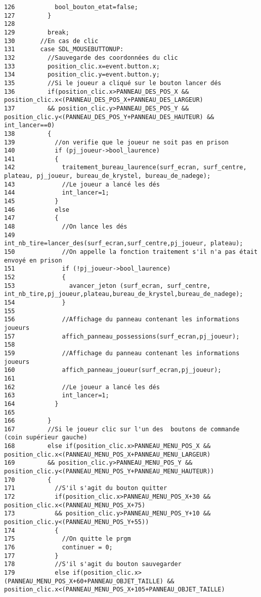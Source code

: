 \begin{Code}
\begin{verbatim}
126           bool_bouton_etat=false;
127         }
128         
129         break;
130       //En cas de clic
131       case SDL_MOUSEBUTTONUP:
132         //Sauvegarde des coordonnées du clic
133         position_clic.x=event.button.x;
134         position_clic.y=event.button.y;
135         //Si le joueur a cliqué sur le bouton lancer dés
136         if(position_clic.x>PANNEAU_DES_POS_X && position_clic.x<(PANNEAU_DES_POS_X+PANNEAU_DES_LARGEUR)
137         && position_clic.y>PANNEAU_DES_POS_Y && position_clic.y<(PANNEAU_DES_POS_Y+PANNEAU_DES_HAUTEUR) && int_lancer==0)
138         {
139           //on verifie que le joueur ne soit pas en prison
140           if (pj_joueur->bool_laurence)
141           {
142             traitement_bureau_laurence(surf_ecran, surf_centre, plateau, pj_joueur, bureau_de_krystel, bureau_de_nadege);
143             //Le joueur a lancé les dés
144             int_lancer=1;
145           }
146           else
147           {
148             //On lance les dés
149             int_nb_tire=lancer_des(surf_ecran,surf_centre,pj_joueur, plateau);
150             //On appelle la fonction traitement s'il n'a pas était envoyé en prison
151             if (!pj_joueur->bool_laurence)
152             {
153               avancer_jeton (surf_ecran, surf_centre, int_nb_tire,pj_joueur,plateau,bureau_de_krystel,bureau_de_nadege);
154             }
155             
156             //Affichage du panneau contenant les informations joueurs
157             affich_panneau_possessions(surf_ecran,pj_joueur);
158   
159             //Affichage du panneau contenant les informations joueurs
160             affich_panneau_joueur(surf_ecran,pj_joueur);
161 
162             //Le joueur a lancé les dés
163             int_lancer=1;
164           }
165 
166         }
167         //Si le joueur clic sur l'un des  boutons de commande (coin supérieur gauche)
168         else if(position_clic.x>PANNEAU_MENU_POS_X && position_clic.x<(PANNEAU_MENU_POS_X+PANNEAU_MENU_LARGEUR)
169         && position_clic.y>PANNEAU_MENU_POS_Y && position_clic.y<(PANNEAU_MENU_POS_Y+PANNEAU_MENU_HAUTEUR))
170         {
171           //S'il s'agit du bouton quitter
172           if(position_clic.x>PANNEAU_MENU_POS_X+30 && position_clic.x<(PANNEAU_MENU_POS_X+75)
173           && position_clic.y>PANNEAU_MENU_POS_Y+10 && position_clic.y<(PANNEAU_MENU_POS_Y+55))
174           {
175             //On quitte le prgm
176             continuer = 0;
177           }
178           //S'il s'agit du bouton sauvegarder
179           else if(position_clic.x>(PANNEAU_MENU_POS_X+60+PANNEAU_OBJET_TAILLE) && position_clic.x<(PANNEAU_MENU_POS_X+105+PANNEAU_OBJET_TAILLE)

\end{verbatim}
\end{Code}
